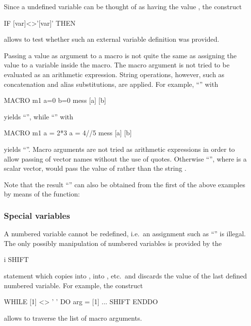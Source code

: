 Since a undefined variable  can be thought of as having the
value , the construct
\begin{XMP}
IF [var]<>'[var]' THEN
\end{XMP}
allows to test whether such an external variable definition was
provided.

Passing a value as argument to a macro is not quite the same as
assigning the value to a variable inside the macro.
The macro argument is not tried to be evaluated as an
arithmetic expression.
String operations, however, such as concatenation and alias
substitutions, are applied.
For example, ``'' with
\begin{XMP}
MACRO m1 a=0 b=0
mess [a] [b]
\end{XMP}
yields ``'', while ``'' with
\begin{XMP}
MACRO m1
a = 2*3
a = 4//5
mess [a] [b]
\end{XMP}
yields ``''.
Macro arguments are not tried as arithmetic expressions in order to
allow passing of vector names without the use of quotes.
Otherwise ``'', where  is a scalar vector,
would pass the value of  rather than the string
.

Note that the result ``'' can also be obtained from the first of the
above examples by means of the  function:



\subsubsection{Special variables}

A numbered variable cannot be redefined, i.e.\
an assignment such as ``'' is illegal.
The only possibly manipulation of numbered variables is provided by
the 
\begin{Gray}{i}
SHIFT
\end{Gray}
statement which copies \Lit{[2]} into \Lit{[1]}, \Lit{[3]} into
\Lit{[2]}, etc.\ and discards the value of the last defined numbered
variable.
For example, the construct
\begin{XMP}
WHILE [1] <> ' ' DO
  arg = [1]
  ... 
  SHIFT
ENDDO
\end{XMP}
allows to traverse the list of macro arguments.

